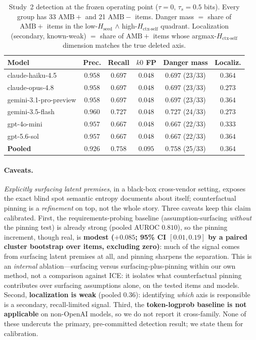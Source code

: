 \documentclass[acmsmall,screen,nonacm]{acmart}
\newcommand{\Hseed}{\ensuremath{H_{\mathrm{seed}}}}
\newcommand{\Hctx}{\ensuremath{H_{\text{ctx-self}}}}
\begin{document}
\begin{table}[t]
\centering
\caption{Study~2 detection at the frozen operating point ($\tau=0$, $\tau_s=0.5$ bits). Every group has
33 $\mathrm{AMB}{+}$ and 21 $\mathrm{AMB}{-}$ items. Danger mass $=$ share of $\mathrm{AMB}{+}$ items in the
low-\Hseed{} $\wedge$ high-\Hctx{} quadrant. Localization (secondary, known-weak) $=$ share of
$\mathrm{AMB}{+}$ items whose argmax-\Hctx{} dimension matches the true deleted axis.}
\label{tab:lps-op}
\footnotesize
\setlength{\tabcolsep}{4pt}
\begin{tabular}{@{}lccccc@{}}
\toprule
Model & Prec. & Recall & $k0$ FP & Danger mass & Localiz. \\
\midrule
claude-haiku-4.5 & $0.958$ & $0.697$ & $0.048$ & $0.697$ (23/33) & $0.364$ \\
claude-opus-4.8  & $0.958$ & $0.697$ & $0.048$ & $0.697$ (23/33) & $0.273$ \\
gemini-3.1-pro-preview & $0.958$ & $0.697$ & $0.048$ & $0.697$ (23/33) & $0.364$ \\
gemini-3.5-flash & $0.960$ & $0.727$ & $0.048$ & $0.727$ (24/33) & $0.273$ \\
gpt-4o-mini      & $0.957$ & $0.667$ & $0.048$ & $0.667$ (22/33) & $0.333$ \\
gpt-5.6-sol      & $0.957$ & $0.667$ & $0.048$ & $0.667$ (22/33) & $0.364$ \\
\midrule
\textbf{Pooled}  & $\mathbf{0.926}$ & $\mathbf{0.758}$ & $0.095$ & $\mathbf{0.758}$ (25/33) & $0.364$ \\
\bottomrule
\end{tabular}
\end{table}

\paragraph{Caveats.} \emph{Explicitly surfacing latent premises}, in
a black-box cross-vendor setting, exposes the exact blind spot semantic entropy documents about itself;
counterfactual pinning is a \emph{refinement} on top, not the whole story. Three caveats keep this claim
calibrated. First, the requirements-probing baseline (assumption-surfacing \emph{without} the pinning
test) is already strong (pooled AUROC $0.810$), so the pinning increment, though real, is
\textbf{modest ($+0.085$; 95\% CI $[0.01,0.19]$ by a paired cluster bootstrap over items, excluding zero)}: much of the signal comes from surfacing latent premises at all, and pinning
sharpens the separation. This is an \emph{internal} ablation---surfacing versus surfacing-plus-pinning within our own method, not a
comparison against ICE: it isolates what counterfactual pinning contributes over surfacing assumptions alone,
on the tested items and models. Second, \textbf{localization is weak} (pooled $0.36$): identifying \emph{which}
axis is responsible is a secondary, recall-limited signal. Third, the \textbf{token-logprob
baseline is not applicable} on non-OpenAI models, so we do not report it cross-family. None of these
undercuts the primary, pre-committed detection result; we state them for calibration.
\end{document}
